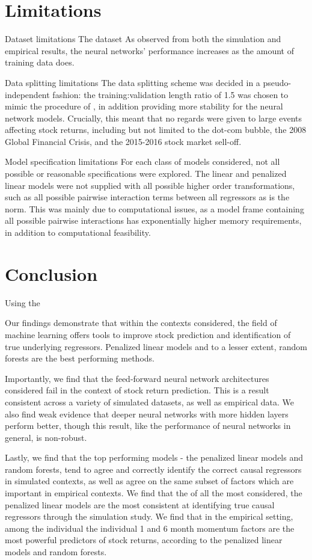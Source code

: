 \documentclass[a4paper, table]{article}
\begin{document}
\section{Limitations}

Dataset limitations
The dataset 
As observed from both the simulation and empirical results, the neural networks' performance increases as the amount of training data does. 

Data splitting limitations
The data splitting scheme was decided in a pseudo-independent fashion: the training:validation length ratio of 1.5 was chosen to mimic the procedure of \cite{gu_empirical_2018}, in addition providing more stability for the neural network models. Crucially, this meant that no regards were given to large events affecting stock returns, including but not limited to the dot-com bubble, the 2008 Global Financial Crisis, and the 2015-2016 stock market sell-off. 

Model specification limitations
For each class of models considered, not all possible or reasonable specifications were explored. The linear and penalized linear models were not supplied with all possible higher order transformations, such as all possible pairwise interaction terms between all regressors as is the norm. This was mainly due to computational issues, as a model frame containing all possible pairwise interactions has exponentially higher memory requirements, in addition to computational feasibility. 

\section{Conclusion}

Using the 

Our findings demonstrate that within the contexts considered, the field of machine learning offers tools to improve stock prediction and identification of true underlying regressors. Penalized linear models and to a lesser extent, random forests are the best performing methods.

Importantly, we find that the feed-forward neural network architectures considered fail in the context of stock return prediction. This is a result consistent across a variety of simulated datasets, as well as empirical data. We also find weak evidence that deeper neural networks with more hidden layers perform better, though this result, like the performance of neural networks in general, is non-robust.

Lastly, we find that the top performing models - the penalized linear models and random forests, tend to agree and correctly identify the correct causal regressors in simulated contexts, as well as agree on the same subset of factors which are important in empirical contexts. We find that the of all the most considered, the penalized linear models are the most consistent at identifying true causal regressors through the simulation study. We find that in the empirical setting, among the individual the individual 1 and 6 month momentum factors are the most powerful predictors of stock returns, according to the penalized linear models and random forests. 
\end{document}
